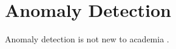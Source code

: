 \section{Anomaly Detection}
\label{relwork:anomaly}

Anomaly detection is not new to academia \cite{10.14778/3538598.3538602} \cite{10.1145/3444690}.